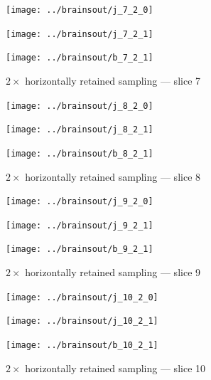 \documentclass{article}
\begin{document}
\begin{figure}
\begin{centering}

\parbox{\imsizes}{\texttt{[image: ../brainsout/j\_7\_2\_0]}}

\vspace{\vertseps}

\parbox{\imsizes}{\texttt{[image: ../brainsout/j\_7\_2\_1]}}
\hfill
\parbox{\imsizes}{\texttt{[image: ../brainsout/b\_7\_2\_1]}}

\end{centering}
\caption{$2\times$ horizontally retained sampling --- slice 7}
\end{figure}


\begin{figure}
\begin{centering}

\parbox{\imsizes}{\texttt{[image: ../brainsout/j\_8\_2\_0]}}

\vspace{\vertseps}

\parbox{\imsizes}{\texttt{[image: ../brainsout/j\_8\_2\_1]}}
\hfill
\parbox{\imsizes}{\texttt{[image: ../brainsout/b\_8\_2\_1]}}

\end{centering}
\caption{$2\times$ horizontally retained sampling --- slice 8}
\end{figure}


\begin{figure}
\begin{centering}

\parbox{\imsizes}{\texttt{[image: ../brainsout/j\_9\_2\_0]}}

\vspace{\vertseps}

\parbox{\imsizes}{\texttt{[image: ../brainsout/j\_9\_2\_1]}}
\hfill
\parbox{\imsizes}{\texttt{[image: ../brainsout/b\_9\_2\_1]}}

\end{centering}
\caption{$2\times$ horizontally retained sampling --- slice 9}
\end{figure}


\begin{figure}
\begin{centering}

\parbox{\imsizes}{\texttt{[image: ../brainsout/j\_10\_2\_0]}}

\vspace{\vertseps}

\parbox{\imsizes}{\texttt{[image: ../brainsout/j\_10\_2\_1]}}
\hfill
\parbox{\imsizes}{\texttt{[image: ../brainsout/b\_10\_2\_1]}}

\end{centering}
\caption{$2\times$ horizontally retained sampling --- slice 10}
\end{figure}
\end{document}
